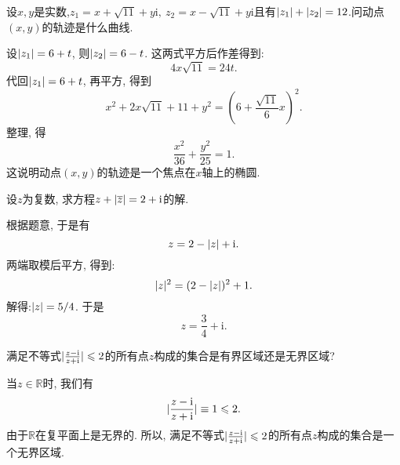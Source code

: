 \begin{yyEx}
	设$x,y$是实数,$z_1 = x+\sqrt{11}+y\mathrm{i},~z_2 = x-\sqrt{11}+y\mathrm{i}$且有$\lvert z_1\rvert+\lvert z_2\rvert = 12$.问动点$(x,y)$的轨迹是什么曲线.
\end{yyEx}

\begin{yySolution}
	设$\lvert z_1\rvert = 6+t$, 则$\lvert z_2\rvert = 6-t$. 这两式平方后作差得到:
	\begin{equation*}
		4x\sqrt{11} = 24t.
	\end{equation*}
	代回$\lvert z_1\rvert = 6+t$, 再平方, 得到
	\begin{equation*}
		x^2 + 2x\sqrt{11} + 11 + y^2 = (6+\frac{\sqrt{11}}{6}x)^2.
	\end{equation*}
	整理, 得\begin{equation*}
		\frac{x^2}{36}+\frac{y^2}{25} = 1.
	\end{equation*}
	这说明动点$(x,y)$的轨迹是一个焦点在$x$轴上的椭圆.
\end{yySolution}

\begin{yyEx}
	设$z$为复数, 求方程$z + \lvert\overline{z}\rvert = 2+\mathrm{i}$的解.
\end{yyEx}

\begin{yySolution}
	根据题意, 于是有\begin{equation*}
		z = 2-\lvert z\rvert + \mathrm{i}.
	\end{equation*}
	两端取模后平方, 得到:
	\begin{equation*}
		\lvert z\rvert^2 = (2-\lvert z\rvert)^2 + 1.
	\end{equation*}
	解得:$\lvert z\rvert = 5/4$.
	于是\begin{equation*}
		z = \frac{3}{4} + \mathrm{i}.
	\end{equation*}
\end{yySolution}

\begin{yyEx}
	满足不等式$\lvert\frac{z-\mathrm{i}}{z+\mathrm{i}}\rvert\leqslant 2$的所有点$z$构成的集合是有界区域还是无界区域?
\end{yyEx}

\begin{yySolution}
	当$z\in \mathbb{R}$时, 我们有
	\begin{equation*}
		\lvert\frac{z-\mathrm{i}}{z+\mathrm{i}}\rvert \equiv 1\leqslant 2.
	\end{equation*}
	由于$\mathbb{R}$在复平面上是无界的. 所以, 满足不等式$\lvert\frac{z-\mathrm{i}}{z+\mathrm{i}}\rvert\leqslant 2$的所有点$z$构成的集合是一个无界区域.
\end{yySolution}

